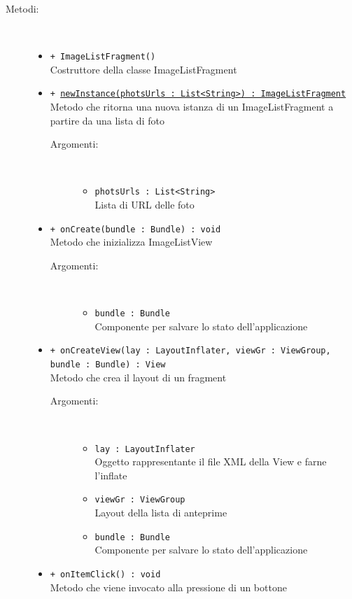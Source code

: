 \documentclass[../DefinizioneDiProdotto.tex]{subfiles}
\begin{document}
\begin{description}
\begin{itemize}
\end{itemize}
\item[Metodi:] \
\begin{itemize}
\item \texttt{+ ImageListFragment()}\\
Costruttore della classe ImageListFragment
 \item \texttt{+ \underline{newInstance(photsUrls : List<String>) : ImageListFragment}}\\
Metodo che ritorna una nuova istanza di un ImageListFragment a partire da una lista di foto
 \begin{description}
\item[Argomenti:] \
\begin{itemize}
\item \texttt{photsUrls : List<String>}\\
Lista di URL delle foto\end{itemize}
\end{description}
\item \texttt{+ onCreate(bundle : Bundle) : void}\\
Metodo che inizializza ImageListView
 \begin{description}
\item[Argomenti:] \
\begin{itemize}
\item \texttt{bundle : Bundle}\\
Componente per salvare lo stato dell'applicazione\end{itemize}
\end{description}
\item \texttt{+ onCreateView(lay : LayoutInflater, viewGr : ViewGroup, bundle : Bundle) : View}\\
Metodo che crea il layout di un fragment
 \begin{description}
\item[Argomenti:] \
\begin{itemize}
\item \texttt{lay : LayoutInflater}\\
Oggetto rappresentante il file XML della View e farne l'inflate\item \texttt{viewGr : ViewGroup}\\
Layout della lista di anteprime\item \texttt{bundle : Bundle}\\
Componente per salvare lo stato dell'applicazione\end{itemize}
\end{description}
\item \texttt{+ onItemClick() : void}\\
Metodo che viene invocato alla pressione di un bottone
 \end{itemize}
\end{description}
\end{document}
